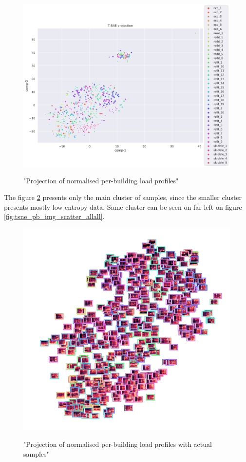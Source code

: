 \begin{figure}[H]
	\centering
	\caption{"Projection of normalised per-building load profiles"}
	\includegraphics[width=1.2\textwidth]{Figures/TSNE/TSNE_per_building/all/scatter_all_all.png}
	\label{fig:tsne_pb_scatter_all_all}
\end{figure}

The figure \ref{fig:tsne_pb_img_norm_scatter_allall} presents only the main cluster of samples,
since the smaller cluster presents mostly low entropy data. 
Same cluster can be seen on far left on figure \ref{fig:tsne_pb_img_scatter_allall}.

\begin{figure}[H]
	\centering
	\caption{"Projection of normalised per-building load profiles with actual samples"}
	\includegraphics[width=.9\textwidth]{Figures/TSNE/TSNE_per_building/all/img_scatter_allall.png}
	\label{fig:tsne_pb_img_norm_scatter_allall}
\end{figure}

